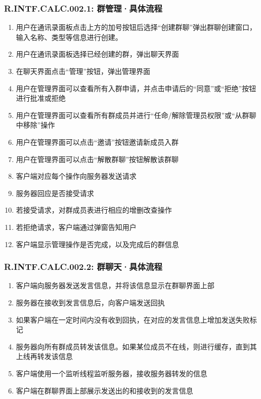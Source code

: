        \subsubsection{R.INTF.CALC.002.1: 群管理·具体流程}
        \begin{enumerate}
            \item 用户在通讯录面板点击上方的加号按钮后选择“创建群聊”弹出群聊创建窗口，输入名称、类型等信息进行创建。
            \item 用户在通讯录面板选择已经创建的群，弹出聊天界面
            \item 在聊天界面点击“管理”按钮，弹出管理界面
            \item 用户在管理界面可以查看所有入群申请，并点击申请后的“同意”或“拒绝”按钮进行批准或拒绝
            \item 用户在管理界面可以查看所有群成员并进行“任命/解除管理员权限”或“从群聊中移除”操作
            \item 用户在管理界面可以点击“邀请”按钮邀请新成员入群
            \item 用户在管理界面可以点击“解散群聊”按钮解散该群聊
            \item 客户端对应每个操作向服务器发送请求
            \item 服务器回应是否接受请求
            \item 若接受请求，对群成员表进行相应的增删改查操作
            \item 若拒绝请求，客户端通过弹窗告知用户
            \item 客户端显示管理操作是否完成，以及完成后的群信息
        \end{enumerate}
        \subsubsection{R.INTF.CALC.002.2: 群聊天·具体流程}
        \begin{enumerate}
            \item 客户端向服务器发送发言信息，并将该信息显示在群聊界面上部
            \item 服务器在接收到发言信息后，向客户端发送回执
            \item 如果客户端在一定时间内没有收到回执，在对应的发言信息上增加发送失败标记
            \item 服务器向所有群成员转发该信息。如果某位成员不在线，则进行缓存，直到其上线再转发该信息
            \item 客户端使用一个监听线程监听服务器，接收服务器转发的信息
            \item 客户端在群聊界面上部展示发送出的和接收到的发言信息
        \end{enumerate}
